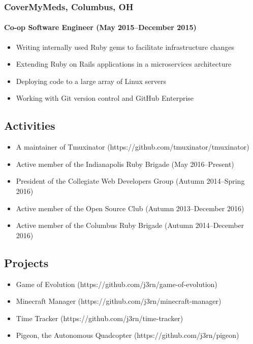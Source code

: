 \documentclass[]{article}
\begin{document}
\subsubsection*{CoverMyMeds, Columbus, OH}
\paragraph{Co-op Software Engineer (May 2015--December 2015)}
\begin{itemize}
\item Writing internally used Ruby gems to facilitate infrastructure changes
\item Extending Ruby on Rails applications in a microservices architecture
\item Deploying code to a large array of Linux servers
\item Working with Git version control and GitHub Enterprise
\end{itemize}

\subsection*{Activities}
\begin{itemize}
\item A maintainer of Tmuxinator (https://github.com/tmuxinator/tmuxinator)
\item Active member of the Indianapolis Ruby Brigade (May 2016--Present)
\item President of the Collegiate Web Developers Group (Autumn 2014--Spring 2016)
\item Active member of the Open Source Club (Autumn 2013--December 2016)
\item Active member of the Columbus Ruby Brigade (Autumn 2014--December 2016)
\end{itemize}

\subsection*{Projects}
\begin{itemize}
\item Game of Evolution (https://github.com/j3rn/game-of-evolution)
\item Minecraft Manager (https://github.com/j3rn/minecraft-manager)
\item Time Tracker (https://github.com/j3rn/time-tracker)
\item Pigeon, the Autonomous Quadcopter (https://github.com/j3rn/pigeon)
\end{itemize}
\end{document}
